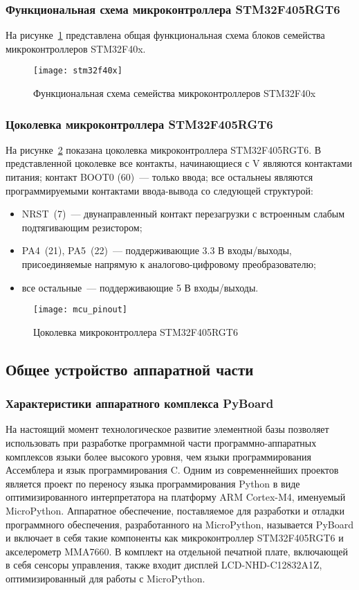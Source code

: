 \documentclass[document.tex]{subfiles}
\begin{document}
\clearpage
\subsubsection{Функциональная схема микроконтроллера STM32F405RGT6}
На рисунке~\ref{fig:mcu} представлена общая функциональная схема блоков семейства микрокон\-троллеров STM32F40x.
\begin{figure}[here]
\centering
\texttt{[image: stm32f40x]}
\caption{Функциональная схема семейства микроконтроллеров STM32F40x}
\label{fig:mcu}
\end{figure}

\clearpage
\subsubsection{Цоколевка микроконтроллера STM32F405RGT6}
На рисунке~\ref{fig:mcu_pinout} показана цоколевка микроконтроллера STM32F405RGT6. В представленной цоколевке все контакты, начинающиеся с V являются контактами питания;
контакт BOOT0 (60)~--- только ввода; все остальнеы являются программируемыми контактами ввода-вывода со следующей структурой:
\begin{itemize}
	\item NRST~(7)~--- двунаправленный контакт перезагрузки с встроенным слабым подтягива\-ющим резистором;
	\item PA4~(21), PA5~(22)~--- поддерживающие 3.3 В входы/выходы, присоединяемые напрямую к аналогово-цифровому преобразователю;
	\item все остальные~--- поддерживающие 5 В входы/выходы.\cite{mcu}
\end{itemize}

\begin{figure}[here]
\centering
\texttt{[image: mcu\_pinout]}
\caption{Цоколевка микроконтроллера STM32F405RGT6}
\label{fig:mcu_pinout}
\end{figure}

\clearpage
\subsection{Общее устройство аппаратной части}
\subsubsection{Характеристики аппаратного комплекса PyBoard}
На настоящий момент технологическое развитие элементной базы позволяет использовать при разработке программной части программно-аппаратных комплексов языки более высоко\-го уровня,
чем языки программирования Ассемблера и язык программирования C. Одним из современнейших проектов является проект по переносу языка программирования Python в виде оптимизированного
интерпретатора на платформу ARM Cortex-M4, именуемый MicroPython. Аппаратное обеспечение, поставляемое для разработки и отладки программного обеспечения, разработанного на
MicroPython, называется PyBoard и включает в себя такие компоненты как микроконтроллер STM32F405RGT6 и акселерометр MMA7660. В комплект на отдельной печатной плате, включающей в
себя сенсоры управления, также входит дисплей LCD-NHD-C12832A1Z, оптимизированный для работы с MicroPython.\cite{pyboard_hardware}
\end{document}
